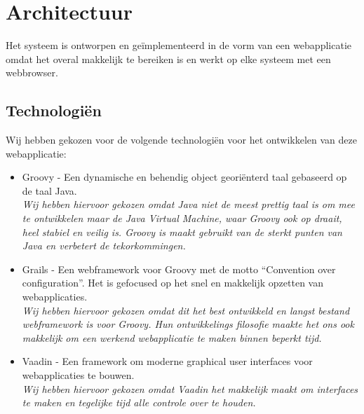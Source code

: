 \chapter{Architectuur}

Het systeem is ontworpen en ge\"implementeerd in de vorm van een webapplicatie omdat het overal makkelijk te bereiken is en werkt op elke systeem met een webbrowser.

\section{Technologi\"en}

Wij hebben gekozen voor de volgende technologi\"en voor het ontwikkelen van deze webapplicatie:
\begin{itemize}
\item Groovy - Een dynamische en behendig object geori\"enterd taal gebaseerd op de taal Java.
\vspace{2mm} \\
\textit{Wij hebben hiervoor gekozen omdat Java niet de meest prettig taal is om mee te ontwikkelen maar de Java Virtual Machine, waar Groovy ook op draait, heel stabiel en veilig is. Groovy is maakt gebruikt van de sterkt punten van Java en verbetert de tekorkommingen.}

\item Grails - Een webframework voor Groovy met de motto ``Convention over configuration''. Het is gefocused op het snel en makkelijk opzetten van webapplicaties.
\vspace{2mm} \\
\textit{Wij hebben hiervoor gekozen omdat dit het best ontwikkeld en langst bestand webframework is voor Groovy. Hun ontwikkelings filosofie maakte het ons ook makkelijk om een werkend webapplicatie te maken binnen beperkt tijd.}

\item Vaadin - Een framework om moderne graphical user interfaces voor webapplicaties te bouwen.
\vspace{2mm} \\
\textit{Wij hebben hiervoor gekozen omdat Vaadin het makkelijk maakt om interfaces te maken en tegelijke tijd alle controle over te houden.}
\end{itemize}